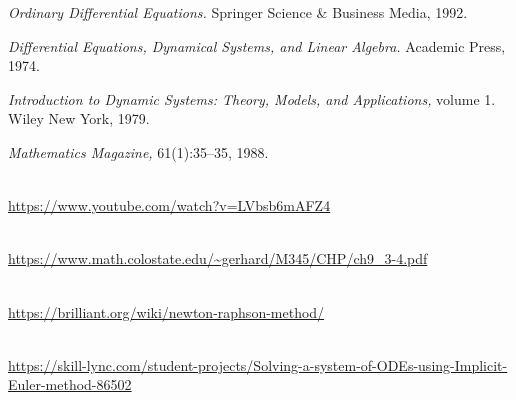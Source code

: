 \begin{thebibliography}{99999}
 {\em Ordinary Differential Equations.}  Springer Science \& Business Media, 1992.

 {\em Differential Equations, Dynamical Systems, and Linear Algebra.} Academic Press, 1974.

 {\em Introduction to Dynamic Systems: Theory, Models, and Applications,} volume 1. Wiley New York, 1979.

 {\em Mathematics Magazine,} 61(1):35–35, 1988.

\\
\url{https://www.youtube.com/watch?v=LVbsb6mAFZ4}

\\
\url{https://www.math.colostate.edu/~gerhard/M345/CHP/ch9_3-4.pdf}

\\
\url{https://brilliant.org/wiki/newton-raphson-method/}

\\
\url{https://skill-lync.com/student-projects/Solving-a-system-of-ODEs-using-Implicit-Euler-method-86502}
\end{thebibliography}